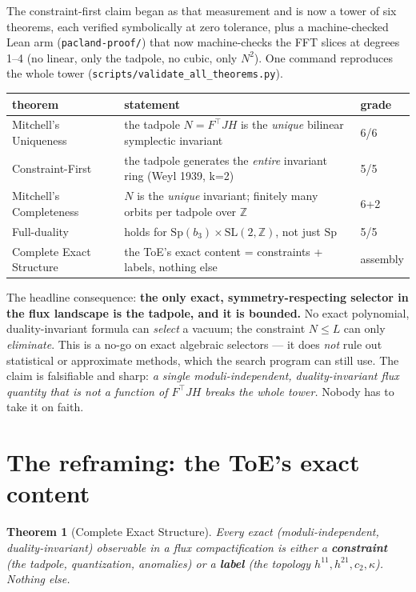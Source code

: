 \documentclass[11pt]{article}
\newtheorem{theorem}{Theorem}
\begin{document}
The constraint-first claim began as that measurement and is now a tower of six
theorems, each verified symbolically at zero tolerance, plus a machine-checked Lean arm
(\texttt{pacland-proof/}) that now machine-checks the FFT slices at degrees 1--4 (no
linear, only the tadpole, no cubic, only $N^2$). One command reproduces the whole tower
(\texttt{scripts/validate\_all\_theorems.py}).

\begin{center}
\begin{tabular}{lll}
\toprule
theorem & statement & grade \\
\midrule
Mitchell's Uniqueness & the tadpole $N=F^\top JH$ is the \emph{unique} bilinear symplectic invariant & 6/6 \\
Constraint-First & the tadpole generates the \emph{entire} invariant ring (Weyl 1939, k=2) & 5/5 \\
Mitchell's Completeness & $N$ is the \emph{unique} invariant; finitely many orbits per tadpole over $\mathbb{Z}$ & 6+2 \\
Full-duality & holds for $\mathrm{Sp}(b_3)\times\mathrm{SL}(2,\mathbb{Z})$, not just $\mathrm{Sp}$ & 5/5 \\
Complete Exact Structure & the ToE's exact content = constraints + labels, nothing else & assembly \\
\bottomrule
\end{tabular}
\end{center}

The headline consequence: \textbf{the only exact, symmetry-respecting selector in the
flux landscape is the tadpole, and it is bounded.} No exact polynomial,
duality-invariant formula can \emph{select} a vacuum; the constraint $N\le L$ can only
\emph{eliminate}. This is a no-go on exact algebraic selectors --- it does \emph{not}
rule out statistical or approximate methods, which the search program can still use.
The claim is falsifiable and sharp: \emph{a single
moduli-independent, duality-invariant flux quantity that is not a function of $F^\top
JH$ breaks the whole tower.} Nobody has to take it on faith.

\section{The reframing: the ToE's exact content}

\begin{theorem}[Complete Exact Structure]
Every exact (moduli-independent, duality-invariant) observable in a flux
compactification is either a \textbf{constraint} (the tadpole, quantization, anomalies)
or a \textbf{label} (the topology $h^{11},h^{21},c_2,\kappa$). Nothing else.
\end{theorem}
\end{document}
